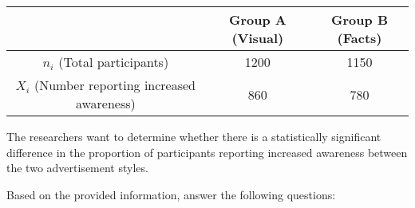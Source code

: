 \documentclass{article}
\begin{document}
\begin{center}
\renewcommand{\arraystretch}{1.5} %
\begin{tabular}{c|c|c}
\hline
     & \textbf{Group A (Visual)} & \textbf{Group B (Facts)} \\ \hline
  $n_i$ (Total participants) &  1200 & 1150 \\ \hline
  $X_i$ (Number reporting increased awareness) &  860 & 780 \\ \hline
\end{tabular}
\end{center}

The researchers want to determine whether there is a statistically significant difference in the proportion of participants reporting increased awareness between the two advertisement styles.

Based on the provided information, answer the following questions:
\end{document}
